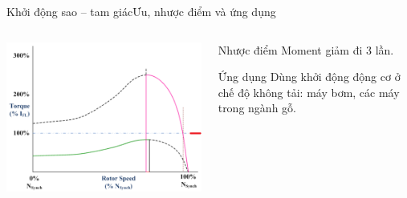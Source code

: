 \documentclass[17pt]{beamer}
\begin{document}
\begin{frame}{Khởi động sao -- tam giác}{Ưu, nhược điểm và ứng dụng}
\begin{columns}

\vspace{-1.5cm}
\begin{center}
\includegraphics[scale=.45]{images-chude1/moment-sao-tamgiac.png} 
\end{center}
\begin{small}	
\begin{block}{Nhược điểm}
Moment giảm đi $3$ lần.
\end{block}			
\begin{block}{Ứng dụng}
Dùng khởi động động cơ ở chế độ không tải: máy bơm, các máy trong ngành gỗ.
\end{block}
\end{small}
\end{columns}
\end{frame}

\end{document}
